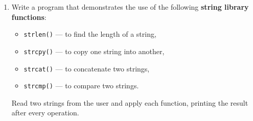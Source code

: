 \begin{enumerate}[leftmargin=*, label=\textbf{Q\arabic*.}]
\item Write a program that demonstrates the use of the following
      \textbf{string library functions}:
      \begin{itemize}
        \item \texttt{strlen()} --- to find the length of a string,
        \item \texttt{strcpy()} --- to copy one string into another,
        \item \texttt{strcat()} --- to concatenate two strings,
        \item \texttt{strcmp()} --- to compare two strings.
      \end{itemize}
      Read two strings from the user and apply each function, printing
      the result after every operation.

\end{enumerate}
